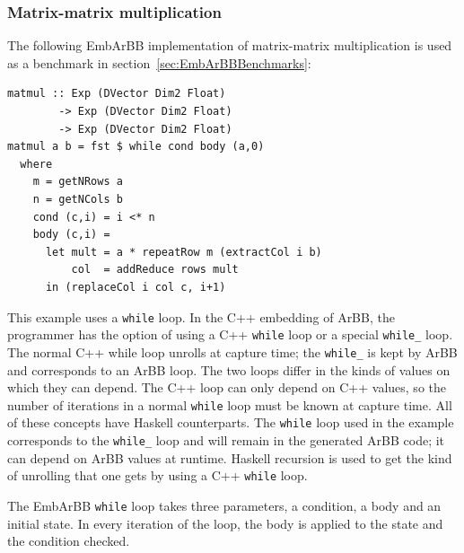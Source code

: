 
\subsubsection{Matrix-matrix multiplication}

The following EmbArBB implementation of matrix-matrix multiplication is used as a benchmark in section~\ref{sec:EmbArBBBenchmarks}:

\begin{verbatim} 
matmul :: Exp (DVector Dim2 Float) 
        -> Exp (DVector Dim2 Float) 
        -> Exp (DVector Dim2 Float) 
matmul a b = fst $ while cond body (a,0)
  where 
    m = getNRows a
    n = getNCols b 
    cond (c,i) = i <* n
    body (c,i) = 
      let mult = a * repeatRow m (extractCol i b)
          col  = addReduce rows mult 
      in (replaceCol i col c, i+1) 
\end{verbatim}

This example uses a {\tt while} loop. In the C++ embedding of ArBB, the programmer 
has the option of using a C++ {\tt while} loop or a special {\tt while\_} loop. The 
normal C++ while loop unrolls at capture time; the {\tt while\_} is kept by ArBB 
and corresponds to an ArBB loop. The two loops differ in the kinds of
values on which they can depend.
The C++ loop can only depend on C++ values, so
the number of iterations in a normal {\tt while} loop must be known at capture 
time. All of these concepts have Haskell counterparts. The {\tt while} loop used in the 
example corresponds to the {\tt while\_} loop and will remain in the generated ArBB 
code; it can depend on ArBB values at runtime.
Haskell recursion is used to get the kind of unrolling 
that one gets by using a C++ {\tt while} loop. 
 
The EmbArBB {\tt while} loop takes three parameters, a condition, a body and an initial state. 
In every iteration of the loop, the body is applied to the state and the condition checked.


